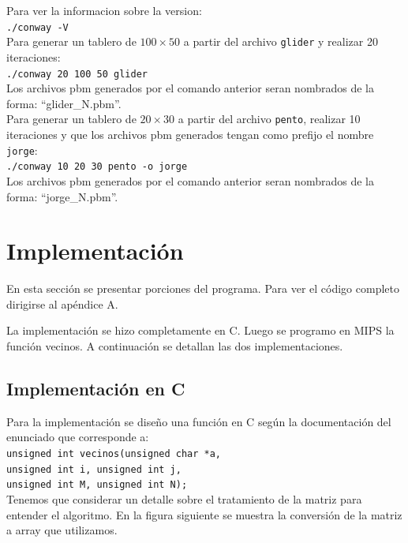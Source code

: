 \documentclass[11pt,a4paper]{article}
\begin{document}
Para ver la informacion sobre la version:\\

\texttt{./conway -V}\\

Para generar un tablero de $100 \times 50$ a partir del archivo \texttt{glider} y realizar 20 iteraciones:\\

\texttt{./conway 20 100 50 glider}\\

Los archivos pbm generados por el comando anterior seran nombrados de la forma: ``glider\_N.pbm''.\\

Para generar un tablero de $20 \times 30$ a partir del archivo \texttt{pento}, realizar 10 iteraciones y que los archivos pbm generados tengan como prefijo el nombre \texttt{jorge}:\\

\texttt{./conway 10 20 30 pento -o jorge}\\

Los archivos pbm generados por el comando anterior seran nombrados de la forma: ``jorge\_N.pbm''.

\section{Implementación}
En esta sección se presentar porciones del programa. Para ver el código completo dirigirse al apéndice A.

La implementación se hizo completamente en C. Luego se programo en MIPS la función vecinos. A continuación se detallan las dos implementaciones.

\subsection{Implementación en C}

Para la implementación se diseño una función en C según la documentación del enunciado que corresponde a:\\
\texttt{unsigned int vecinos(unsigned char *a,\\
	unsigned int i, unsigned int j,\\
	unsigned int M, unsigned int N);}\\

Tenemos que considerar un detalle sobre el tratamiento de la matriz para entender el algoritmo. En la figura siguiente se muestra la conversión de la matriz a array que utilizamos.
\end{document}
